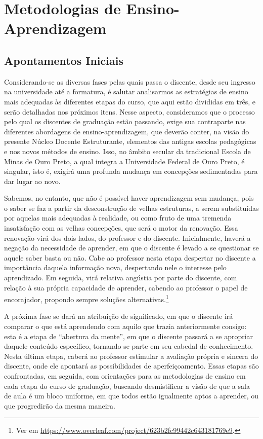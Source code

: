 \documentclass[
	12pt,				%
	openright,			%
	oneside,			%
	a4paper,			%
	english,			%
	brazil				%
	]{abntex2}
\begin{document}
\chapter{Metodologias de Ensino-Aprendizagem}
\label{cap:05} 
\section{Apontamentos Iniciais}
%
Considerando-se as diversas fases pelas quais passa o discente, desde seu ingresso na universidade até a formatura, é salutar analisarmos as estratégias de ensino mais adequadas às diferentes etapas do curso, que aqui estão divididas em três, e serão detalhadas nos próximos itens. Nesse aspecto, consideramos que o processo pelo qual os discentes de graduação estão passando, exige sua contraparte nas diferentes abordagens de ensino-aprendizagem, que deverão conter, na visão do presente Núcleo Docente Estruturante, elementos das antigas escolas pedagógicas e nos novos métodos de ensino. Isso, no âmbito secular da tradicional Escola de Minas de Ouro Preto, a qual integra a Universidade Federal de Ouro Preto, é singular, isto é, exigirá uma profunda mudança em concepções sedimentadas para dar lugar ao novo.

Sabemos, no entanto, que não é possível haver aprendizagem sem mudança, pois o saber se faz a partir da desconstrução de velhas estruturas, a serem substituídas por aquelas mais adequadas à realidade, ou como fruto de uma tremenda insatisfação com as velhas concepções, que será o motor da renovação. Essa renovação virá dos dois lados, do professor e do discente. Inicialmente, haverá a negação da necessidade de aprender, em que o discente é levado a se questionar se aquele saber basta ou não. Cabe ao professor nesta etapa despertar no discente a importância daquela informação nova, despertando nele o interesse pelo aprendizado. Em seguida, virá relativa angústia por parte do discente, com relação à sua própria capacidade de aprender, cabendo ao professor o papel de encorajador, propondo sempre soluções alternativas.\footnote{Ver em \url{https://www.overleaf.com/project/623b2fc99442c643181769e9}.}

A próxima fase se dará na atribuição de significado, em que o discente irá comparar o que está aprendendo com aquilo que trazia anteriormente consigo: esta é a etapa de “abertura da mente”, em que o discente passará a se apropriar daquele conteúdo específico, tornando-se parte em seu cabedal de conhecimento. Nesta última etapa, caberá ao professor estimular a avaliação própria e sincera do discente, onde ele apontará as possibilidades de aperfeiçoamento. Essas etapas são confrontadas, em seguida, com orientações para as metodologias de ensino em cada etapa do curso de graduação, buscando desmistificar a visão de que a sala de aula é um bloco uniforme, em que todos estão igualmente aptos a aprender, ou que progredirão da mesma maneira.
\end{document}
